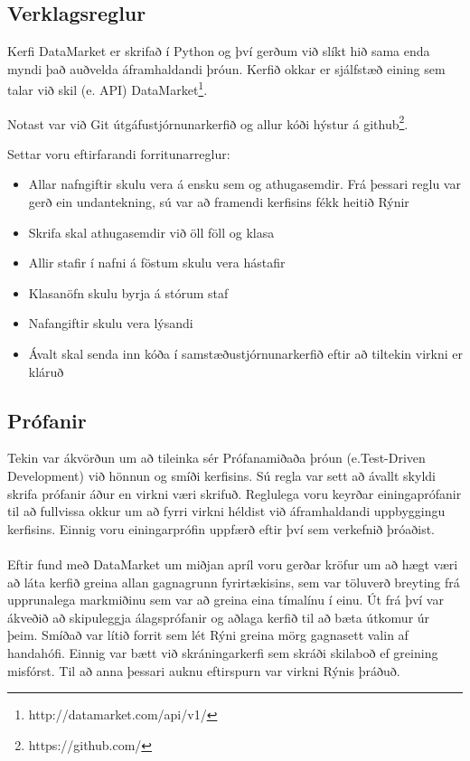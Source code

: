 \documentclass{article}
\begin{document}
\subsection{Verklagsreglur}
Kerfi DataMarket er skrifað í Python og því gerðum við slíkt hið sama enda myndi það auðvelda áframhaldandi þróun. Kerfið okkar er sjálfstæð eining sem talar við skil (e. API) DataMarket\footnote[1]{http://datamarket.com/api/v1/}. 
	
Notast var við Git útgáfustjórnunarkerfið og allur kóði hýstur á github\footnote[2]{https://github.com/}. 

Settar voru eftirfarandi forritunarreglur:

\begin{itemize}
  \item Allar nafngiftir skulu vera á ensku sem og athugasemdir. Frá þessari reglu var gerð ein undantekning, sú var að framendi kerfisins fékk heitið Rýnir
  \item Skrifa skal athugasemdir við öll föll og klasa
  \item Allir stafir í nafni á föstum skulu vera hástafir
  \item Klasanöfn skulu byrja á stórum staf
  \item Nafangiftir skulu vera lýsandi
  \item Ávalt skal senda inn kóða í samstæðustjórnunarkerfið eftir að tiltekin virkni er kláruð
\end{itemize}

\subsection{Prófanir}
Tekin var ákvörðun um að tileinka sér Prófanamiðaða þróun (e.Test-Driven Development) við hönnun og smíði kerfisins.
Sú regla var sett að ávallt skyldi skrifa prófanir áður en virkni væri skrifuð.
Reglulega voru keyrðar einingaprófanir til að fullvissa okkur um að fyrri virkni héldist við áframhaldandi uppbyggingu kerfisins.
Einnig voru einingarprófin uppfærð eftir því sem verkefnið þróaðist.
\\ \hfill
\\
Eftir fund með DataMarket um miðjan apríl voru gerðar kröfur um að hægt væri að láta kerfið greina allan gagnagrunn fyrirtækisins, sem var töluverð breyting 
frá upprunalega markmiðinu sem var að greina eina tímalínu í einu.
Út frá því var ákveðið að skipuleggja álagsprófanir og aðlaga kerfið til að bæta útkomur úr þeim.
Smíðað var lítið forrit sem lét Rýni greina mörg gagnasett valin af handahófi. Einnig var bætt við skráningarkerfi 
sem skráði skilaboð ef greining misfórst. Til að anna þessari auknu eftirspurn var virkni Rýnis þráðuð.
\end{document}

